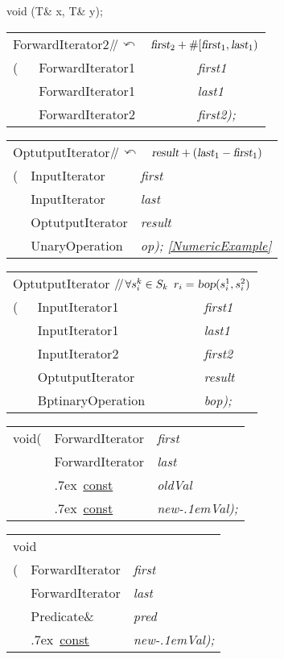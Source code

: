 \documentclass[c5size,landscape,twoside,a4paper]{ctexart}
\makeatletter
\newif\ifafour
\newif\ifletter
\let\ifafour\iftrue
\let\ifletter\iffalse
\newcommand{\<}{\ensuremath{\langle}}
\renewcommand{\>}{\ensuremath{\rangle}}
\newcommand{\BinaryOperation}{{\bbfont B}\hs\concfont inaryOperation}
\newcommand{\ForwardIterator}{{\bbfont F}{\concfont orwardIterator}}
\newcommand{\InputIterator}{{\bbfont I}{\concfont nputIterator}}
\newcommand{\OutputIterator}{{\bbfont O}{\hs}{\concfont utputIterator}}
\newcommand{\Predicate}{{{\bbfont P}\concfont redicate}}
\newcommand{\seeExample}{{\normalsize\Pisymbol{pzd}{43}}}
\renewcommand{\T}{{\bbfont T}}
\newcommand{\UnaryOperation}{{\bbfont U}\concfont naryOperation}
\newcommand{\hs}[1][1]{\hskip #1pt}
\newcommand{\newVal}{new{\kern-.1em}Val}
\newcommand{\slsl}{\ensuremath{/\kern-.2em/}} %
\newcommand{\textComm}[1]{\textsl{\textsf{#1}}}
\newcommand{\Cppslsl}{\enskip\slsl\enskip}
\newcommand{\CppComm}[1]{\Cppslsl\textComm{#1}}
\newcommand{\const}{\mbox{}\raise.7ex\hbox{{%
                    \tiny \underline{\underline{\textsf{const}}}}}\hskip.2em}
\newcommand{\ret}{\ensuremath{\curvearrowleft}}
\newcommand{\commcr}{{\normalfont{,}} \\}
\newcommand{\doColorNamed}[2]{\color[named]{#1}{#2}}
\newcommand{\doColorNamed}[2]{#2}
\newcommand{\StrongClrBf}[1]{{\small\doColorNamed{Red}\textbf{#1}}}
\newenvironment{funcdec}
 { %
   \ifletter
     \setlength{\extrarowheight}{-2pt}
   \else
     \setlength{\extrarowheight}{-4pt}
   \fi
        \setlength{\tabcolsep}{0pt}
   \begin{tabular}{ll @{\quad}>{\slshape}l}}
 {\end{tabular}}
\newcommand{\lp}{(}
\newcommand{\rp}{)}
\newcommand{\lbrk}{[}
\newcommand{\parVal}[2]{{\slshape#1}{\textnormal#2}}
\newcommand{\lastPar}[1]{\parVal{#1}{\rp;}}
\newcommand{\range}[2]{\lbrk#1,#2\rp}
\newcommand{\fliRange}[1]{\range{{\textsl{first}_{#1}}}{{\textsl{last}_{#1}}}}
\makeatother
\begin{document}
\begin{multicols}{4}
void \StrongClrBf{swap}(\T\& x, \T\& y);


\begin{funcdec}
\multicolumn{3}{l}{\ForwardIterator2\CppComm{\ret\ %
                   \(\textsl{first}_2+\#\fliRange1\)}}\\
\StrongClrBf{swap_ranges}\lp& \ForwardIterator1 & first1\commcr
                           & \ForwardIterator1 & last1\commcr
                           & \ForwardIterator2 & \lastPar{first2}
\end{funcdec}


\begin{funcdec}
\multicolumn{3}{l}{\OutputIterator\CppComm{\ret\ %
                   \(\textsl{result}+(\textsl{last}_1-\textsl{first}_1)\)}}\\
\StrongClrBf{transform}\lp& \InputIterator & first\commcr
                          & \InputIterator & last\commcr
                          & \OutputIterator & result\commcr
                          & \UnaryOperation & \lastPar{op} 
  \quad\seeExample\ref{NumericExample}
\end{funcdec}


\begin{funcdec}
\multicolumn{3}{l}{\OutputIterator
      \Cppslsl\(\forall s^k_i \in S_k\enskip
                   r_i=\textsl{bop}(s^1_i, s^2_i)\)}\\
\StrongClrBf{transform}\lp& \InputIterator1 & first1\commcr
                          & \InputIterator1 & last1\commcr
                          & \InputIterator2 & first2\commcr
                          & \OutputIterator & result\commcr
                          & \BinaryOperation & \lastPar{bop}
\end{funcdec}

\begin{funcdec}
void\enskip \StrongClrBf{replace}\lp& \ForwardIterator & first\commcr
                        & \ForwardIterator & last\commcr
                        & \const\ \T\&     & oldVal\commcr
                        & \const\ \T\&     & \lastPar{\newVal}
\end{funcdec}


\begin{funcdec}
\multicolumn{3}{l}{void}\\
\StrongClrBf{replace_if}\lp& \ForwardIterator & first\commcr
                          & \ForwardIterator & last\commcr
                          & \Predicate\&     & pred\commcr
                          & \const\ \T\&     & \lastPar{\newVal}
\end{funcdec}



\end{multicols}
\end{document}
